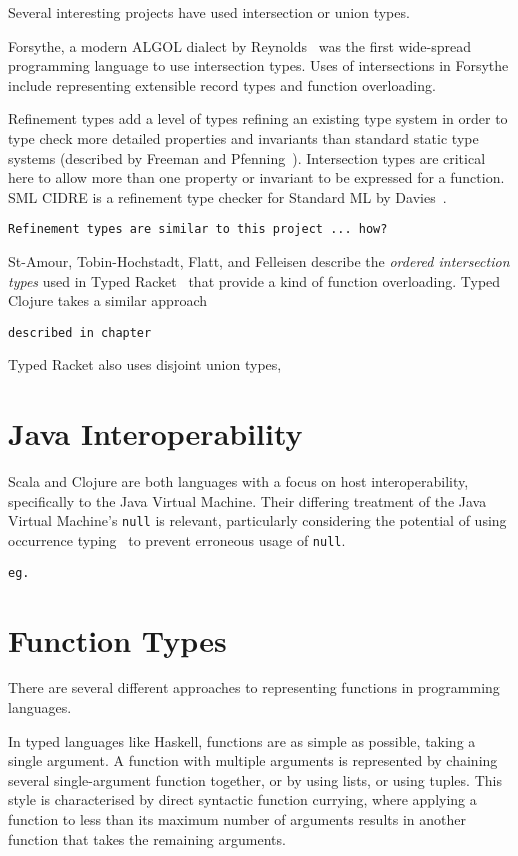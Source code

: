 Several interesting projects have used intersection or union types.

Forsythe, a modern ALGOL dialect by Reynolds~\cite{Rey96} was the first wide-spread 
programming language to use intersection types.
Uses of intersections in Forsythe include representing extensible record types
and function overloading.

Refinement types add a level of types refining an existing type system
in order to type check more detailed properties and invariants than standard static type systems
(described by Freeman and Pfenning~\cite{FP91}).
Intersection types are critical here to allow more than one property or invariant
to be expressed for a function.
SML CIDRE is a refinement type checker for Standard ML by Davies~\cite{Dav05}.
\begin{verbatim}
Refinement types are similar to this project ... how?
\end{verbatim}

St-Amour, Tobin-Hochstadt, Flatt, and Felleisen
describe the \emph{ordered intersection types} used in Typed Racket~\cite{St12}
that provide a kind of function overloading.
Typed Clojure takes a similar approach
\begin{verbatim}
described in chapter
\end{verbatim}
Typed Racket also uses disjoint union types, 

\section{Java Interoperability}

Scala and Clojure are both languages with a focus on host interoperability, specifically
to the Java Virtual Machine. Their differing treatment of the Java Virtual Machine's \lstinline|null| is
relevant, particularly considering the potential of using occurrence typing~\cite{TF10}
to prevent erroneous usage of \lstinline|null|.
\begin{verbatim}
eg.
\end{verbatim}

\section{Function Types}

There are several different approaches to representing functions in programming languages.

In typed languages like Haskell, functions are as simple as possible, taking a single argument.
A function with multiple arguments is represented by chaining several single-argument function
together, or by using lists, or using tuples. This style is characterised by direct syntactic function currying, where applying
a function to less than its maximum number of arguments results in another function
that takes the remaining arguments.

